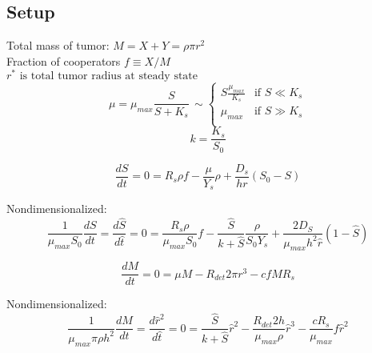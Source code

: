 \documentclass[11pt]{amsart}
\begin{document}
		\subsection{Setup}
			\begin{center}
				Total mass of tumor:
				\(M = X + Y = \rho \pi r^2\) \\
				Fraction of cooperators 
				\(f \equiv X/M\) \\
				\(r^* \textrm{ is total tumor radius at steady state}\) 
				\begin{equation*} 
					\mu = \mu_{max} \frac{S}{S + K_s} \, \sim
					\begin{cases}
						S\frac{\mu_{max}}{K_s} &\textrm{if } S \ll K_s \\
						\mu_{max} &\textrm{if } S \gg K_s \\
					\end{cases} 
				\end{equation*}
				\[k = \frac{K_s}{S_0}\]
			\end{center}
			\begin{equation}
				\frac{dS}{dt} = 0 = R_s\rho f - \frac{\mu}{Y_s}\rho + \frac{D_s}{hr}(S_0 - S)
				\label{hss:dSdt}
			\end{equation}

			Nondimensionalized:
			\begin{equation}
				\frac{1}{\mu_{max}S_0}\frac{dS}{dt} = \frac{d\hat{S}}{d\hat{t}} = 0
					= \frac{R_s\rho}{\mu_{max}S_0}f
						- \frac{\hat{S}}{k + \hat{S}}\frac{\rho}{S_0Y_s}
						+ \frac{2D_S}{\mu_{max}h^2\hat{r}}(1-\hat{S})
				\label{hss:nd:dSdt}
			\end{equation}

			\begin{equation}
				\frac{dM}{dt} = 0 = \mu M - R_{det}2\pi r^3 - cfMR_s %
				\label{hss:dMdt}
			\end{equation}

			Nondimensionalized:
			\begin{equation}
				\frac{1}{\mu_{max}\pi\rho h^2}\frac{dM}{dt} = \frac{d\hat{r}^2}{d\hat{t}} = 0
					= \frac{\hat{S}}{k + \hat{S}}\hat{r}^2 
						- \frac{R_{det}2 h}{\mu_{max}\rho}\hat{r}^3 
						- \frac{cR_s}{\mu_{max}}f\hat{r}^2
				\label{hss:nd:dMdt}
			\end{equation}
\end{document}
